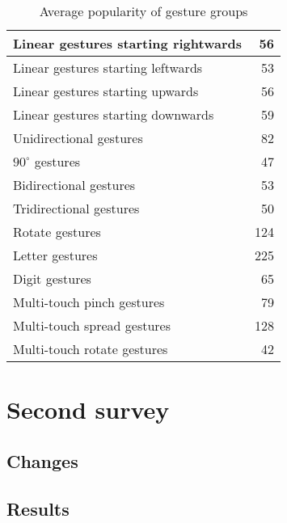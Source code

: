 \documentclass{aes130}
\begin{document}
\begin{table} \label{tab:Survey1AverageGroups}
\begin{center}
\begin{tabular}{|l|r|} \hline

Linear gestures starting rightwards &  56 \\ \hline
Linear gestures starting leftwards  &  53 \\ \hline
Linear gestures starting upwards    &  56 \\ \hline
Linear gestures starting downwards  &  59 \\ \hline \hline

Unidirectional gestures             &  82 \\ \hline
$90^\circ$ gestures                 &  47 \\ \hline
Bidirectional gestures              &  53 \\ \hline
Tridirectional gestures             &  50 \\ \hline \hline

Rotate gestures                     & 124 \\ \hline \hline

Letter gestures                     & 225 \\ \hline
Digit gestures                      &  65 \\ \hline \hline

Multi-touch pinch gestures          &  79 \\ \hline
Multi-touch spread gestures         & 128 \\ \hline
Multi-touch rotate gestures         &  42 \\ \hline

\end{tabular}
\end{center}
\caption{Average popularity of gesture groups}
\end{table}


\section{Second survey} \label{sec:Survey2}

\subsection{Changes} \label{sec:Survey2Changes}

\subsection{Results} \label{sec:Survey2Results}
\end{document}
